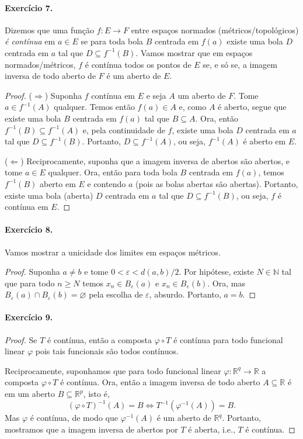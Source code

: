 \documentclass[12pt,a4paper]{article}
\begin{document}
\paragraph{Exercício 7.} Dizemos que uma função $f: E \to F$ entre espaços normados (métricos/topológicos) \textit{é contínua}
em $a\in E$ se para toda bola $B$ centrada em $f(a)$ existe uma bola $D$ centrada em $a$ tal que $D \subseteq f^{-1}(B)$. Vamos
mostrar que em espaços normados/métricos, $f$ é contínua todos os pontos de $E$ se, e só se, a imagem inversa de todo aberto de
$F$ é um aberto de $E$.
\begin{proof}
($\Rightarrow$) Suponha $f$ contínua em $E$ e seja $A$ um aberto de $F$. Tome $a\in f^{-1}(A)$ qualquer. Temos então $f(a)\in A$ e,
como $A$ é aberto, segue que existe uma bola $B$ centrada em $f(a)$ tal que $B\subseteq A$. Ora, então $f^{-1}(B) \subseteq f^{-1}(A)$
e, pela continuidade de $f$, existe uma bola $D$ centrada em $a$ tal que $D \subseteq f^{-1}(B)$. Portanto, $D \subseteq f^{-1}(A)$,
ou seja, $f^{-1}(A)$ é aberto em $E$.

($\Leftarrow$) Reciprocamente, suponha que a imagem inversa de abertos são abertos, e tome $a\in E$ qualquer. 
Ora, então para toda bola $B$ centrada em $f(a)$, temos $f^{-1}(B)$ aberto em $E$ e contendo $a$ (pois as bolas abertas são abertas). 
Portanto, existe uma bola (aberta) $D$ centrada em $a$ tal que $D \subseteq f^{-1}(B)$, ou seja, $f$ é contínua em $E$.
\end{proof}

\paragraph{Exercício 8.} Vamos mostrar a unicidade dos limites em espaços métricos. 
\begin{proof}
Suponha $a\neq b$ e tome $0 < \varepsilon < d(a,b)/2$. Por hipótese, existe $N\in\mathbb{N}$ tal que 
para todo $n\geq N$ temos $x_n \in B_{\varepsilon}(a)$ e $x_n\in B_{\varepsilon}(b)$. Ora, mas 
$B_{\varepsilon}(a)\cap B_{\varepsilon}(b) = \varnothing$ pela escolha de $\varepsilon$, absurdo. Portanto, $a=b$.
\end{proof}

\paragraph{Exercício 9.}
\begin{proof}
Se $T$ é contínua, então a composta $\varphi\circ T$ é contínua para todo funcional linear $\varphi$ pois tais funcionais são
todos contínuos.

Reciprocamente, suponhamos que para todo funcional linear $\varphi: \mathbb{R}^q \to \mathbb{R}$ a composta $\varphi\circ T$ 
é contínua. Ora, então a imagem inversa de todo aberto $A\subseteq\mathbb{R}$ é
em um aberto $B\subseteq\mathbb{R}^p$, isto é,
\begin{equation*}
    (\varphi\circ T)^{-1}(A) = B \iff T^{-1}(\varphi^{-1}(A)) = B.
\end{equation*}
Mas $\varphi$ é contínua, de modo que $\varphi^{-1}(A)$ é um aberto de $\mathbb{R}^q$. Portanto,
mostramos que a imagem inversa de abertos por $T$ é aberta, i.e., $T$ é contínua.
\end{proof}
\end{document}
